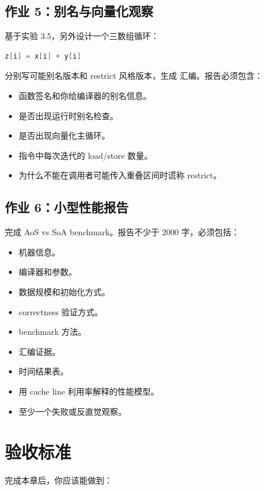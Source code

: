 \begin{exercisebox}
\subsection*{作业 5：别名与向量化观察}

基于实验 3.5，另外设计一个三数组循环：

\begin{lstlisting}[language=C++]
z[i] = x[i] + y[i]
\end{lstlisting}

分别写可能别名版本和 restrict 风格版本，生成  汇编。报告必须包含：

\begin{itemize}
  \item 函数签名和你给编译器的别名信息。
  \item 是否出现运行时别名检查。
  \item 是否出现向量化主循环。
  \item 指令中每次迭代的 load/store 数量。
  \item 为什么不能在调用者可能传入重叠区间时谎称 restrict。
\end{itemize}

\subsection*{作业 6：小型性能报告}

完成 AoS vs SoA benchmark。报告不少于 2000 字，必须包括：

\begin{itemize}
  \item 机器信息。
  \item 编译器和参数。
  \item 数据规模和初始化方式。
  \item correctness 验证方式。
  \item benchmark 方法。
  \item 汇编证据。
  \item 时间结果表。
  \item 用 cache line 利用率解释的性能模型。
  \item 至少一个失败或反直觉观察。
\end{itemize}
\end{exercisebox}

\section{验收标准}

完成本章后，你应该能做到：

